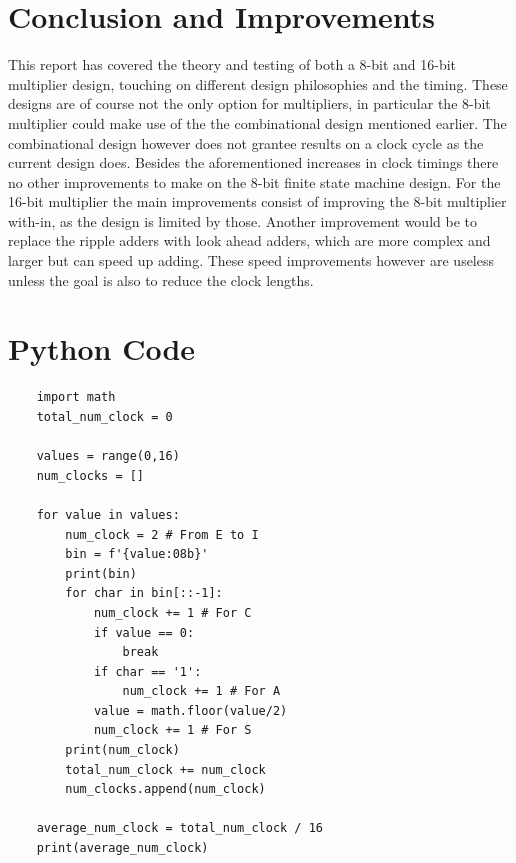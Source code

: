 \documentclass[11pt]{article}
\begin{document}
\section{Conclusion and Improvements}
This report has covered the theory and testing of both a 8-bit and 16-bit multiplier design,
touching on different design philosophies and the timing.
These designs are of course not the only option for multipliers, in particular the 8-bit multiplier could make use of the the combinational design mentioned earlier.
The combinational design however does not grantee results on a clock cycle as the current design does.
Besides the aforementioned increases in clock timings there no other improvements to make on the 8-bit finite state machine design.
For the 16-bit multiplier the main improvements consist of improving the 8-bit multiplier with-in, as the design is limited by those.
Another improvement would be to replace the ripple adders with look ahead adders, which are more complex and larger but can speed up adding.
These speed improvements however are useless unless the goal is also to reduce the clock lengths.

\pagebreak
\appendix
\section{Python Code}
\begin{lstlisting}
    import math
    total_num_clock = 0
    
    values = range(0,16)
    num_clocks = []
    
    for value in values:
        num_clock = 2 # From E to I
        bin = f'{value:08b}'
        print(bin)
        for char in bin[::-1]:
            num_clock += 1 # For C
            if value == 0:
                break
            if char == '1':
                num_clock += 1 # For A
            value = math.floor(value/2)
            num_clock += 1 # For S
        print(num_clock)
        total_num_clock += num_clock
        num_clocks.append(num_clock)
    
    average_num_clock = total_num_clock / 16
    print(average_num_clock)
\end{lstlisting}

\pagebreak
\printbibliography
\end{document}
